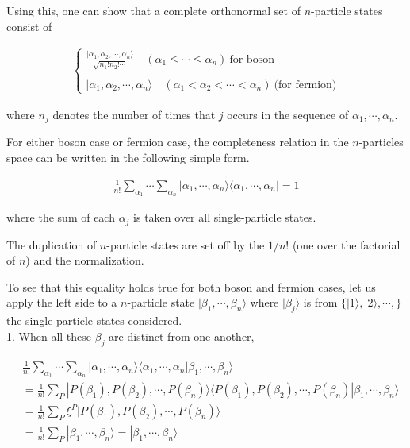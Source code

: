 Using this, one can show that a complete orthonormal set of $n$-particle states consist of

\begin{align}\begin{cases}
\displaystyle\frac{|\alpha_1,\alpha_2,\cdots,\alpha_n\rangle}{\sqrt{n_1!n_2!\cdots}} \quad (\alpha_1\le\cdots\le\alpha_n) \ \text{for boson}\\
\ \\
|\alpha_1,\alpha_2,\cdots,\alpha_n\rangle \quad (\alpha_1<\alpha_2<\cdots<\alpha_n)\ \text{(for fermion)}
\end{cases}\end{align}

where $n_j$ denotes the number of times that $j$ occurs in the sequence of $\alpha_1,\cdots,\alpha_n$. 

For either boson case or fermion case, the completeness relation in the $n$-particles space can be written in the following simple form. 

\begin{align}
\frac{1}{n!}\sum_{\alpha_1}\cdots\sum_{\alpha_n}|\alpha_1,\cdots,\alpha_n\rangle\langle\alpha_1,\cdots,\alpha_n| = 1
\end{align}

where the sum of each $\alpha_j$ is taken over all single-particle states. 

The duplication of $n$-particle states are set off by the $1/n!$ (one over the factorial of $n$) and the normalization. 

To see that this equality holds true for both boson and fermion cases, let us apply the left side to a $n$-particle state $|\beta_1,\cdots,\beta_n\rangle$ where $|\beta_j\rangle$ is from $\{|1\rangle,|2\rangle,\cdots,\}$ the single-particle states considered. \\

{\Huge 1. }When all these $\beta_j$ are distinct from one another, 

\[\begin{split}
&\frac{1}{n!}\sum_{\alpha_1}\cdots\sum_{\alpha_n}|\alpha_1,\cdots,\alpha_n\rangle\langle\alpha_1,\cdots,\alpha_n|\beta_1,\cdots,\beta_n\rangle\\
&=\frac{1}{n!}\sum_P|P(\beta_1),P(\beta_2),\cdots,P(\beta_n)\rangle\langle P(\beta_1),P(\beta_2),\cdots,P(\beta_n)|\beta_1,\cdots,\beta_n\rangle\\
&=\frac{1}{n!}\sum_P\xi^P|P(\beta_1),P(\beta_2),\cdots,P(\beta_n)\rangle\\
&=\frac{1}{n!}\sum_P|\beta_1,\cdots,\beta_n\rangle = |\beta_1,\cdots,\beta_n\rangle
\end{split}\]

